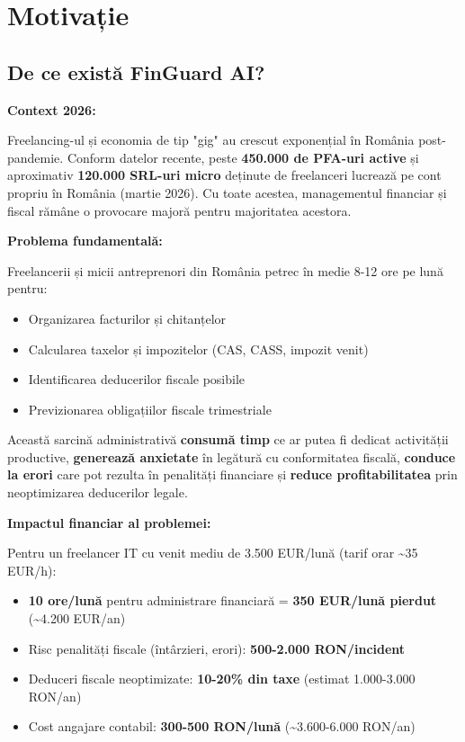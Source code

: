 \documentclass[11pt,a4paper]{article}
\begin{document}
\section{Motivație}

\subsection{De ce există FinGuard AI?}

\textbf{Context 2026:}

Freelancing-ul și economia de tip "gig" au crescut exponențial în România post-pandemie. Conform datelor recente, peste \textbf{450.000 de PFA-uri active} și aproximativ \textbf{120.000 SRL-uri micro} deținute de freelanceri lucrează pe cont propriu în România (martie 2026). Cu toate acestea, managementul financiar și fiscal rămâne o provocare majoră pentru majoritatea acestora.

\textbf{Problema fundamentală:}

Freelancerii și micii antreprenori din România petrec în medie 8-12 ore pe lună pentru:
\begin{itemize}[nosep]
    \item Organizarea facturilor și chitanțelor
    \item Calcularea taxelor și impozitelor (CAS, CASS, impozit venit)
    \item Identificarea deducerilor fiscale posibile
    \item Previzionarea obligațiilor fiscale trimestriale
\end{itemize}

Această sarcină administrativă \textbf{consumă timp} ce ar putea fi dedicat activității productive, \textbf{generează anxietate} în legătură cu conformitatea fiscală, \textbf{conduce la erori} care pot rezulta în penalități financiare și \textbf{reduce profitabilitatea} prin neoptimizarea deducerilor legale.

\textbf{Impactul financiar al problemei:}

Pentru un freelancer IT cu venit mediu de 3.500 EUR/lună (tarif orar \textasciitilde35 EUR/h):
\begin{itemize}[nosep]
    \item \textbf{10 ore/lună} pentru administrare financiară = \textbf{350 EUR/lună pierdut} (\textasciitilde4.200 EUR/an)
    \item Risc penalități fiscale (întârzieri, erori): \textbf{500-2.000 RON/incident}
    \item Deduceri fiscale neoptimizate: \textbf{10-20\% din taxe} (estimat 1.000-3.000 RON/an)
    \item Cost angajare contabil: \textbf{300-500 RON/lună} (\textasciitilde3.600-6.000 RON/an)
\end{itemize}
\end{document}
